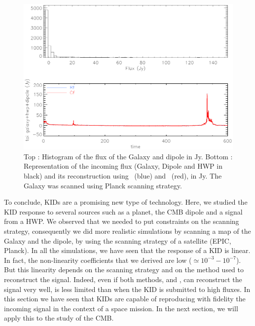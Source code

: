 \begin{figure}[h]
  \includegraphics[clip,angle=0,width=\columnwidth]{Figures/histo_gal_dip_planck.eps}
  \caption{Top : Histogram of the flux of the Galaxy and dipole in Jy. Bottom : Representation of the incoming flux (Galaxy, Dipole and HWP in black) and its reconstruction using \rf\ (blue) and \cf\ (red), in Jy. The Galaxy was scanned using Planck scanning strategy.}
  \label{fig:histo-gal-dip}
\end{figure}



To conclude, KIDs are a promising new type of technology. Here, we studied the KID response to several sources such as a planet, the CMB dipole and a signal from a HWP. We observed that we needed to put constraints on the scanning strategy, consequently we did more realistic simulations by scanning a map of the Galaxy and the dipole, by using the scanning strategy of a satellite (EPIC, Planck). In all the simulations, we have seen that the response of a KID is linear. In fact, the non-linearity coefficients that we derived are low (\eps $\simeq 10^{-3} - 10^{-7}$). But this linearity depends on the scanning strategy and on the method used to reconstruct the signal. Indeed, even if both methods, \rf and \cf, can reconstruct the signal very well, \cf is less limited than \rf when the KID is submitted to high fluxes.
In this section we have seen that KIDs are capable of reproducing with fidelity the incoming signal in the context of a space mission. In the next section, we will apply this to the study of the CMB. 


